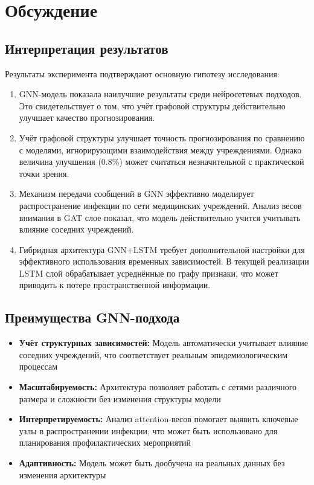 \documentclass[12pt,a4paper]{article}
\begin{document}
	\section{Обсуждение}
	\subsection{Интерпретация результатов}
	Результаты эксперимента подтверждают основную гипотезу исследования:
	\begin{enumerate}
		\item GNN-модель показала наилучшие результаты среди нейросетевых подходов. Это свидетельствует о том, что учёт графовой структуры действительно улучшает качество прогнозирования.
		\item Учёт графовой структуры улучшает точность прогнозирования по сравнению с моделями, игнорирующими взаимодействия между учреждениями. Однако величина улучшения (0.8\%) может считаться незначительной с практической точки зрения.
		\item Механизм передачи сообщений в GNN эффективно моделирует распространение инфекции по сети медицинских учреждений. Анализ весов внимания в GAT слое показал, что модель действительно учится учитывать влияние соседних учреждений.
		\item Гибридная архитектура GNN+LSTM требует дополнительной настройки для эффективного использования временных зависимостей. В текущей реализации LSTM слой обрабатывает усреднённые по графу признаки, что может приводить к потере пространственной информации.
	\end{enumerate}
	
	\subsection{Преимущества GNN-подхода}
	\begin{itemize}
		\item \textbf{Учёт структурных зависимостей:} Модель автоматически учитывает влияние соседних учреждений, что соответствует реальным эпидемиологическим процессам
		\item \textbf{Масштабируемость:} Архитектура позволяет работать с сетями различного размера и сложности без изменения структуры модели
		\item \textbf{Интерпретируемость:} Анализ attention-весов помогает выявить ключевые узлы в распространении инфекции, что может быть использовано для планирования профилактических мероприятий
		\item \textbf{Адаптивность:} Модель может быть дообучена на реальных данных без изменения архитектуры
	\end{itemize}
	
\end{document}
